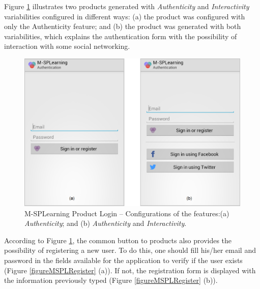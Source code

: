 Figure \ref{figureMSPLLogin} illustrates two products generated with \textit{Authenticity} and \textit{Interactivity} variabilities configured in different ways: (a) the product was configured with only the Authenticity feature; and (b) the product was generated with both variabilities, which explains the authentication form with the possibility of interaction with some social networking.

\begin{figure}[!ht]
\centering
\includegraphics[scale=0.35]{figures/section3/MSPLLogin}
\caption{M-SPLearning Product Login -- Configurations of the features:\newline(a) \textit{Authenticity}; and (b) \textit{Authenticity} and \textit{Interactivity}.}
\label{figureMSPLLogin}
\end{figure}

According to Figure \ref{figureMSPLLogin}, the common button to products also provides the possibility of registering a new user. To do this, one should fill his/her email and password in the fields available for the application to verify if the user exists (Figure \ref{figureMSPLRegister} (a)). If not, the registration form is displayed with the information previously typed (Figure \ref{figureMSPLRegister} (b)).

